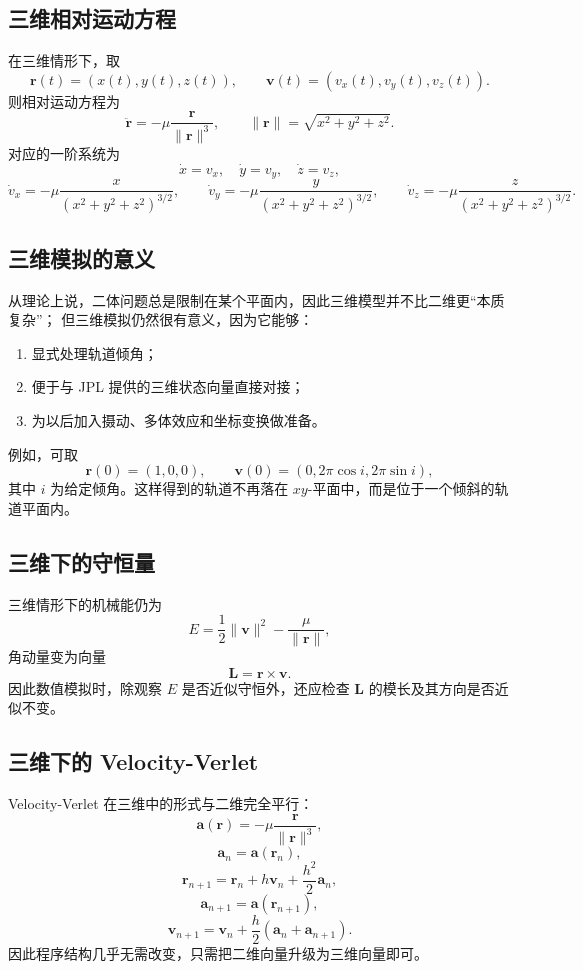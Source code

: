 \subsection{三维相对运动方程}

在三维情形下\cite{MurrayDermott1999,BateMuellerWhite1971}，取
\[
\bm r(t)=(x(t),y(t),z(t)),
\qquad
\bm v(t)=(v_x(t),v_y(t),v_z(t)).
\]
则相对运动方程为
\[
\ddot{\bm r}=-\mu \frac{\bm r}{\|\bm r\|^3},
\qquad
\|\bm r\|=\sqrt{x^2+y^2+z^2}.
\]
对应的一阶系统为
\[
\dot x=v_x,\quad \dot y=v_y,\quad \dot z=v_z,
\]
\[
\dot v_x=-\mu \frac{x}{(x^2+y^2+z^2)^{3/2}},\qquad
\dot v_y=-\mu \frac{y}{(x^2+y^2+z^2)^{3/2}},\qquad
\dot v_z=-\mu \frac{z}{(x^2+y^2+z^2)^{3/2}}.
\]

\subsection{三维模拟的意义}

从理论上说，二体问题总是限制在某个平面内，因此三维模型并不比二维更“本质复杂”；
但三维模拟仍然很有意义，因为它能够：
\begin{enumerate}[label=\arabic*.]
  \item 显式处理轨道倾角；
  \item 便于与 JPL 提供的三维状态向量直接对接\cite{JPLHorizonsManual}；
  \item 为以后加入摄动、多体效应和坐标变换做准备。
\end{enumerate}

例如，可取
\[
\bm r(0)=(1,0,0),
\qquad
\bm v(0)=\left(0,2\pi\cos i,2\pi\sin i\right),
\]
其中 \(i\) 为给定倾角。这样得到的轨道不再落在 \(xy\)-平面中，而是位于一个倾斜的轨道平面内。

\subsection{三维下的守恒量}

三维情形下的机械能仍为\cite{MurrayDermott1999}
\[
E=\frac12\|\bm v\|^2-\frac{\mu}{\|\bm r\|},
\]
角动量变为向量
\[
\bm L=\bm r\times \bm v.
\]
因此数值模拟时，除观察 \(E\) 是否近似守恒外，还应检查 \(\bm L\) 的模长及其方向是否近似不变。

\subsection{三维下的 Velocity-Verlet}

Velocity-Verlet 在三维中的形式与二维完全平行：
\[
\bm a(\bm r)=-\mu \frac{\bm r}{\|\bm r\|^3},
\]
\[
\bm a_n=\bm a(\bm r_n),
\]
\[
\bm r_{n+1}=\bm r_n+h\bm v_n+\frac{h^2}{2}\bm a_n,
\]
\[
\bm a_{n+1}=\bm a(\bm r_{n+1}),
\]
\[
\bm v_{n+1}=\bm v_n+\frac{h}{2}(\bm a_n+\bm a_{n+1}).
\]
因此程序结构几乎无需改变，只需把二维向量升级为三维向量即可\cite{HairerLubichWanner2006,LeimkuhlerReich2004}。

